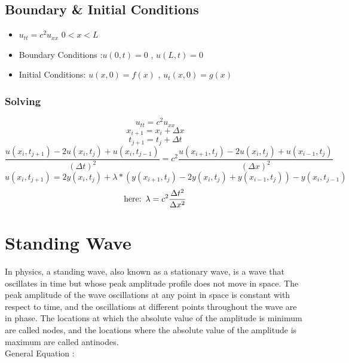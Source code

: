 \documentclass[oneside,hidelinks]{book}
\begin{document}
                \section{Boundary \& Initial Conditions}
                \begin{center}
                \begin{itemize}
                        \item $u_{tt}=c^2u_{xx}$  $0<x<L$
                        \item Boundary Conditions :$ u(0,t)=0$ , $u(L,t)=0$
                        \item Initial Conditions: $u(x,0)=f(x)$ , $u_t(x,0)=g(x)$
                \end{itemize}        
                \end{center}
                \subsection{Solving}
                $$u_{tt}=c^2u_{xx}$$
                $$x_{i+1}=x_i+\Delta x$$
                $$t_{j+1}=t_j+\Delta t$$
                $$\frac{u(x_{i},t_{j+1})-2u(x_i,t_j)+u(x_i,t_{j-1})}{(\Delta t)^2}=c^2 \frac {u(x_{i+1},t_j)-2u(x_i,t_j)+u(x_{i-1},t_j)}{(\Delta x)^2}$$
                $$u(x_i,t_{j+1}) = 2y(x_i,t_j) +  \lambda*(y(x_{i+1},t_j)-2y(x_i,t_j) + y(x_{i-1},t_j)) - y(x_i,t_{j-1})$$
                $$\text{here:} \hspace*{5pt} \lambda=c^2\frac{\Delta t^2}{\Delta x^2}$$
                
        \chapter{Standing Wave}
        In physics, a standing wave, also known as a stationary wave, is a wave that oscillates in time but whose peak 
        amplitude profile does not move in space. The peak amplitude of the wave oscillations at any point in space is 
        constant with respect to time, and the oscillations at different points throughout the wave are in phase. The locations at which the absolute value of the amplitude is
         minimum are called nodes, and the locations where the absolute value of the amplitude is maximum are called antinodes.\\
        
        General Equation :
                 
\end{document}
